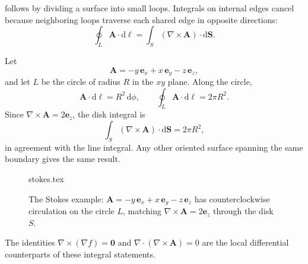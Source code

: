  follows by dividing a surface into small loops. Integrals on internal edges cancel because neighboring loops traverse each shared edge in opposite directions:
\begin{equation}
\oint_L\mathbf{A}\cdot\mathrm{d}\boldsymbol{\ell}
=\int_S(\nabla\times\mathbf{A})\cdot\mathrm{d}\mathbf{S}.
\end{equation}

\begin{example}
Let
\begin{equation}
\mathbf{A}=-y\,\mathbf{e}_x+x\,\mathbf{e}_y-z\,\mathbf{e}_z,
\end{equation}
and let $L$ be the circle of radius $R$ in the $xy$ plane. Along the circle,
\begin{equation}
\mathbf{A}\cdot\mathrm{d}\boldsymbol{\ell}=R^2\,\mathrm{d}\phi,
\qquad
\oint_L\mathbf{A}\cdot\mathrm{d}\boldsymbol{\ell}=2\pi R^2.
\end{equation}
Since $\nabla\times\mathbf{A}=2\mathbf{e}_z$, the disk integral is
\begin{equation}
\int_S(\nabla\times\mathbf{A})\cdot\mathrm{d}\mathbf{S}
=2\pi R^2,
\end{equation}
in agreement with the line integral. Any other oriented surface spanning the same boundary gives the same result.
\end{example}

\begin{figure}[htb]
    \centering
    {stokes.tex}
    \caption{The Stokes example: $\mathbf{A}=-y\,\mathbf{e}_x+x\,\mathbf{e}_y-z\,\mathbf{e}_z$ has counterclockwise circulation on the circle $L$, matching $\nabla\times\mathbf{A}=2\mathbf{e}_z$ through the disk $S$.}
    \label{fig:vec-stokes}
\end{figure}

The identities $\nabla\times(\nabla f)=\mathbf{0}$ and
$\nabla\cdot(\nabla\times\mathbf{A})=0$ are the local differential counterparts of these integral statements.